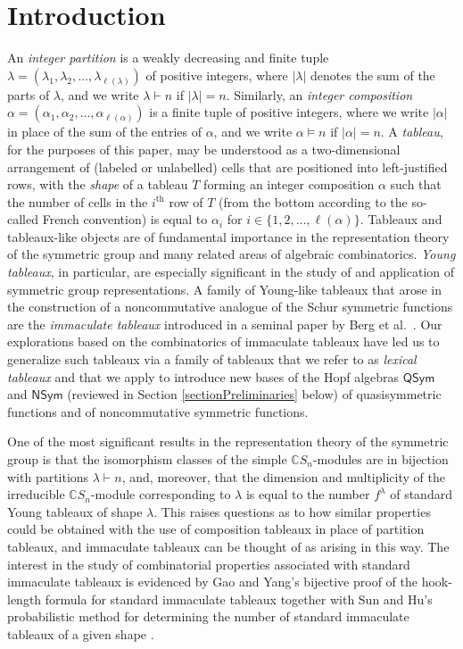 \documentclass{amsart}
\theoremstyle{definition}
\begin{document}
\section{Introduction}
 An \emph{integer partition} is a weakly decreasing and finite tuple $\lambda = (\lambda_1, \lambda_2, \ldots, \lambda_{\ell(\lambda)})$ 
 of positive integers, where $|\lambda|$ denotes the sum of the parts of $\lambda$, and we write $\lambda \vdash n$ if $|\lambda| = 
 n$. Similarly, an \emph{integer composition} $\alpha = (\alpha_1, \alpha_2, \ldots, \alpha_{\ell(\alpha)})$ is a finite tuple of positive 
 integers, where we write $|\alpha|$ in place of the   sum of the entries of $\alpha$, and we write $\alpha \vDash n$ if $|\alpha| = n$. A  
 \emph{tableau}, for the purposes of this paper,   may be understood as a two-dimensional arrangement of (labeled or unlabelled) cells 
 that are positioned into left-justified rows,   with the \emph{shape} of a tableau $T$ forming an integer composition $\alpha$ such that  
 the number of cells in the $i^{\text{th}}$   row of $T$ (from the bottom according to the so-called French convention) is equal to  
 $\alpha_i$ for $i \in \{ 1, 2, \ldots, \ell(\alpha) \}$.   Tableaux and tableaux-like objects are of fundamental importance in the representation  
 theory of the symmetric group and many   related areas of algebraic combinatorics. \emph{Young tableaux}, in particular, are especially  
 significant in the study of and application of   symmetric group representations. A family of Young-like tableaux that arose in the  
 construction of a noncommutative analogue of the   Schur symmetric functions are the \emph{immaculate tableaux} introduced in a  
 seminal paper by Berg et  al.~\cite{BergBergeronSaliolaSerranoZabrocki2014}.  Our explorations based on the combinatorics of  
 immaculate tableaux have led us to   generalize such tableaux via a family of tableaux that we refer to as \emph{lexical tableaux} and that  
 we apply to introduce new bases of   the Hopf algebras $\textsf{QSym}$ and $\textsf{NSym}$ (reviewed in Section  
 \ref{sectionPreliminaries} below) of quasisymmetric  functions and of noncommutative symmetric functions. 

 One of the most significant results in the representation theory of the symmetric group is that the isomorphism classes of the simple 
 $\mathbb{C}S_n$-modules are in bijection with partitions $\lambda \vdash n$, and, moreover, that the dimension and multiplicity of 
 the irreducible $\mathbb{C}S_n$-module corresponding to $\lambda$ is equal to the number $f^{\lambda}$ of standard Young tableaux 
 of shape $\lambda$. This raises questions as to how similar properties could be obtained with the use of composition tableaux in place 
 of partition tableaux, and immaculate tableaux can be thought of as arising in this way. The interest in the study of combinatorial 
 properties associated with standard immaculate tableaux is evidenced by Gao and Yang's bijective proof of the hook-length formula for 
 standard immaculate tableaux \cite{GaoYang2016} together with Sun and Hu's probabilistic method for determining the number of 
 standard immaculate tableaux of a given shape \cite{SunHu2018}. 
\end{document}
